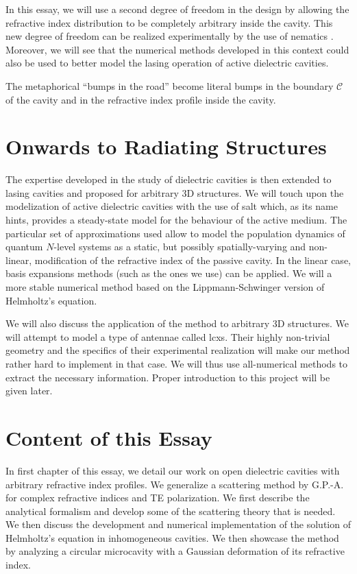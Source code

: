 In this essay, we will use a second degree of freedom in the design
by allowing the refractive index distribution to be completely
arbitrary inside the cavity. This new degree of freedom can be realized
experimentally by the use of nematics \cite{PTA2013}. 
Moreover, we will see that the numerical
methods developed in this context could also be used to better model the lasing 
operation of active dielectric cavities. 

The metaphorical ``bumps in the road'' become literal bumps in the 
boundary $\mathcal{C}$ of the cavity and in the refractive index
profile inside the cavity.


\section{Onwards to Radiating Structures}
The expertise developed in the study of dielectric cavities is then
extended to lasing cavities and proposed for arbitrary
3D structures. We will touch upon the modelization of active
dielectric cavities with the use of \gls{salt} which, as its name
hints, provides a steady-state model for the behaviour of the 
active medium. The particular set of approximations used 
allow to model the population dynamics of quantum $N$-level
systems as a static, but possibly spatially-varying and non-linear, 
modification of the refractive index of the passive cavity. 
In the linear case, basis expansions methods (such as the ones
we use) can be applied. We will a more stable numerical method
based on the Lippmann-Schwinger version of Helmholtz's equation.

We will also discuss the application of the method to arbitrary 
3D structures. We will attempt to model a type of antennae 
called \glspl{lcx}. Their highly non-trivial geometry and the specifics
of their experimental realization will make our method rather hard 
to implement in that case. We will thus use all-numerical methods 
to extract the necessary information. Proper introduction to this project
will be given later.

\section{Content of this Essay}

In first chapter of this essay, we detail our work on open
dielectric cavities with arbitrary refractive index profiles. 
We generalize a scattering method by G.P.-A. \cite{GAP2013a} for 
complex refractive indices and TE polarization. We first describe
the analytical formalism and develop some of the scattering theory 
that is needed. We then discuss the development and numerical implementation
of the solution of Helmholtz's equation in inhomogeneous cavities. 
We then showcase the method by analyzing a circular microcavity with a 
Gaussian deformation of its refractive index. 

